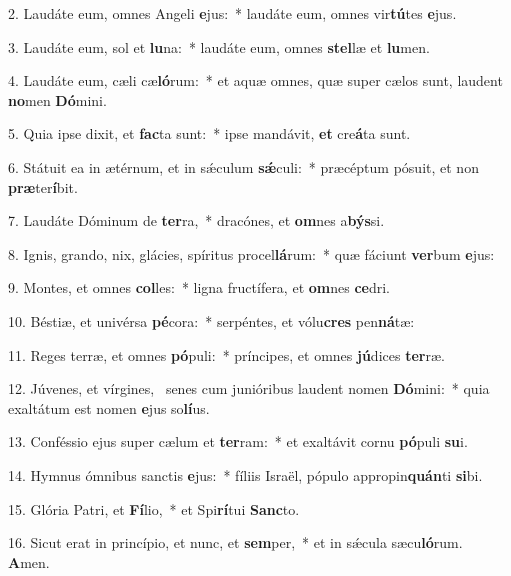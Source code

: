2. Laudáte eum, omnes Angeli \textbf{e}jus:~*  laudáte eum, omnes vir\textbf{tú}tes \textbf{e}jus.\

3. Laudáte eum, sol et \textbf{lu}na:~*  laudáte eum, omnes \textbf{stel}læ et \textbf{lu}men.\

4. Laudáte eum, cæli cæ\textbf{ló}rum:~*  et aquæ omnes, quæ super cælos sunt, laudent \textbf{no}men \textbf{Dó}mini.\

5. Quia ipse dixit, et \textbf{fac}ta sunt:~*  ipse mandávit, \textbf{et} cre\textbf{á}ta sunt.\

6. Státuit ea in ætérnum, et in sǽculum \textbf{sǽ}culi:~*  præcéptum pósuit, et non \textbf{præ}ter\textbf{í}bit.\

7. Laudáte Dóminum de \textbf{ter}ra,~*  dracónes, et \textbf{om}nes a\textbf{býs}si.\

8. Ignis, grando, nix, glácies, spíritus procel\textbf{lá}rum:~*  quæ fáciunt \textbf{ver}bum \textbf{e}jus:\

9. Montes, et omnes \textbf{col}les:~*  ligna fructífera, et \textbf{om}nes \textbf{ce}dri.\

10. Béstiæ, et univérsa \textbf{pé}cora:~*  serpéntes, et vólu\textbf{cres} pen\textbf{ná}tæ:\

11. Reges terræ, et omnes \textbf{pó}puli:~*  príncipes, et omnes \textbf{jú}dices \textbf{ter}ræ.\

12. Júvenes, et vírgines, \dag\  senes cum junióribus laudent nomen \textbf{Dó}mini:~*  quia exaltátum est nomen \textbf{e}jus so\textbf{lí}us.\

13. Conféssio ejus super cælum et \textbf{ter}ram:~*  et exaltávit cornu \textbf{pó}puli \textbf{su}i.\

14. Hymnus ómnibus sanctis \textbf{e}jus:~*  fíliis Israël, pópulo appropin\textbf{quán}ti \textbf{si}bi.\

15. Glória Patri, et \textbf{Fí}lio,~*  et Spi\textbf{rí}tui \textbf{Sanc}to.\

16. Sicut erat in princípio, et nunc, et \textbf{sem}per,~*  et in sǽcula sæcu\textbf{ló}rum. \textbf{A}men.\

